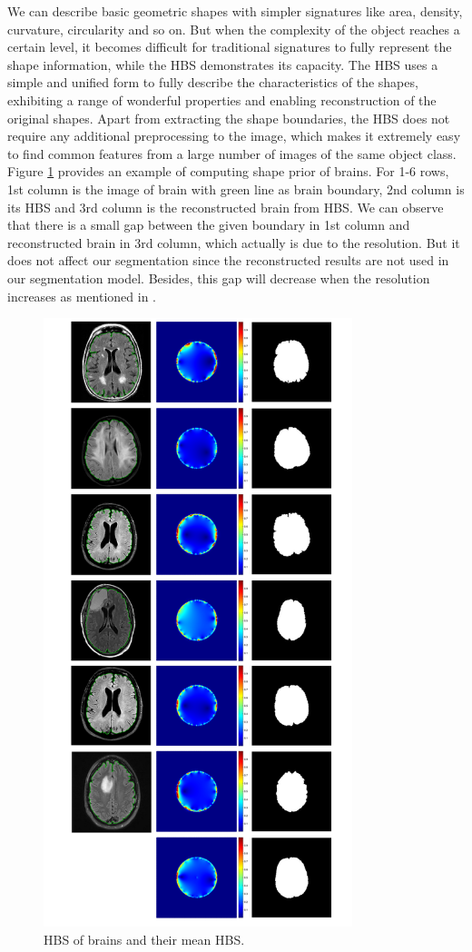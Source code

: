 \documentclass[review,onefignum,onetabnum]{siamonline190516}
\begin{document}
We can describe basic geometric shapes with simpler signatures like area, density, curvature, circularity and so on. But when the complexity of the object reaches a certain level, it becomes difficult for traditional signatures to fully represent the shape information, while the HBS demonstrates its capacity. The HBS uses a simple and unified form to fully describe the characteristics of the shapes, exhibiting a range of wonderful properties and enabling reconstruction of the original shapes. Apart from extracting the shape boundaries, the HBS does not require any additional preprocessing to the image, which makes it extremely easy to find common features from a large number of images of the same object class. Figure \ref{exp5} provides an example of computing shape prior of brains. For 1-6 rows, 1st column is the image of brain with green line as brain boundary, 2nd column is its HBS and 3rd column is the reconstructed brain from HBS. We can observe that there is a small gap between the given boundary in 1st column and reconstructed brain in 3rd column, which actually is due to the resolution. But it does not affect our segmentation since the reconstructed results are not used in our segmentation model. Besides, this gap will decrease when the resolution increases as mentioned in \cite{}.
\begin{figure}
    \begin{center}
        \includegraphics[width=9cm]{src/exp5.png}
    \end{center}
    \caption{HBS of brains and their mean HBS.}
    \label{exp5}
\end{figure}
\end{document}
